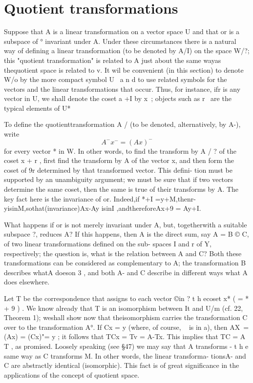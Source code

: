 \section{Quotient transformations}

Suppose that A is a linear transformation on a vector space U and that or is a subspace of ° invariant under A. Under these circumstances there is a natural way of defining a linear transformation (to be denoted by A/I) on the space W/?; this "quotient transformation" is related to A just about the same wayas thequotient space is related to v. It wil be convenient (in this section) to denote W/o by the more compact symbol U ~a n d to use related symbols for the vectors and the linear
transformations that occur. Thus, for instance, ifr is any vector in U, we shall denote the coset a +I by x~; objects such as r~ are the typical elements of U*

To define the quotienttransformation A / (to be denoted, alternatively, by A-), write
\begin{equation*}
    A^{-}x^{-} = (Ax)^{-}
\end{equation*}
for every vector * in W. In other words, to find the transform by A / ? of the coset x + r , first find the transform by A of the vector x, and then form the coset of 9r determined by that transformed vector. This defini- tion must be supported by an unambiguity argument; we must be sure that if two vectors determine the same coset, then the same is true of their transforms by A. The key fact here is the invariance of or. Indeed,if *+I =y+M,thenr- yisinM,sothat(invariance)Ax-Ay isinI ,andthereforeAx+9 = Ay+I.

What happens if or is not merely invariant under A, but, togetherwith a suitable subspace ?, reduces A? If this happens, then A is the direct sum, say A = B © C, of two linear transformations defined on the sub- spaces I and r of Y, respectively; the question is, what is the relation between A and C? Both these transformations can be considered as
complementary to A; the transformation B describes whatA doeson 3 , and both A- and C describe in different ways what A does elsewhere.

Let T be the correspondence that assigns to each vector ©in ? t h ecoset
x* ( = * + 9 ) . We know already that T is an isomorphism between It and U/m (cf. 22, Theorem 1); weshall show now that theisomorphism carries the transformation C over to the transformation A°. If Cx = y
(where, of course, ~ is in a), then AX~= (Ax) = (Cx)"= y ; it follows that TCx = Tv = A-Tx. This implies that TC = A T , as
promised. Loosely speaking (see §47) we may say that A transforms - t h e same way as C transforms M. In other words, the linear transforma- tionsA- and C are abstractly identical (isomorphic). This fact is of great significance in the applications of the concept of quotient space.


